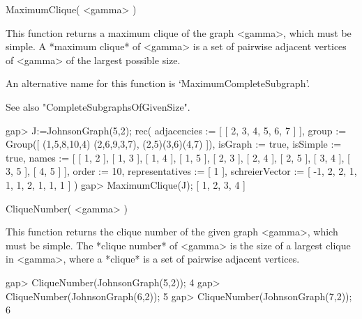 
\>MaximumClique( <gamma> )

This function returns a maximum clique of the graph <gamma>, which must
be simple.  A *maximum clique*
of <gamma> is a
set of pairwise adjacent vertices of <gamma> of the largest possible size.

An alternative name for this function is
`MaximumCompleteSubgraph'.

See also "CompleteSubgraphsOfGivenSize".

\beginexample
gap> J:=JohnsonGraph(5,2);
rec( adjacencies := [ [ 2, 3, 4, 5, 6, 7 ] ], group := Group([ (1,5,8,10,4)
  (2,6,9,3,7), (2,5)(3,6)(4,7) ]), isGraph := true, isSimple := true, 
  names := [ [ 1, 2 ], [ 1, 3 ], [ 1, 4 ], [ 1, 5 ], [ 2, 3 ], [ 2, 4 ], 
      [ 2, 5 ], [ 3, 4 ], [ 3, 5 ], [ 4, 5 ] ], order := 10, 
  representatives := [ 1 ], schreierVector := [ -1, 2, 2, 1, 1, 1, 2, 1, 1, 1 
     ] )
gap> MaximumClique(J);
[ 1, 2, 3, 4 ]
\endexample


\>CliqueNumber( <gamma> )

This function returns the clique number of the given graph <gamma>,
which must be simple.  The *clique number*
of <gamma> is the size of a largest clique in <gamma>, where a *clique*
is a set of pairwise adjacent vertices.

\beginexample
gap> CliqueNumber(JohnsonGraph(5,2));
4
gap> CliqueNumber(JohnsonGraph(6,2));
5
gap> CliqueNumber(JohnsonGraph(7,2));
6
\endexample
